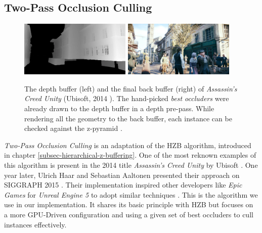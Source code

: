 \subsection{Two-Pass Occlusion Culling} \label{subsec-two-pass-occlusion-culling}

\begin{figure}[h]
    \centering
    \includegraphics[width=200px]{images/graphics/depth-buffer-ac-unity.png}
    \includegraphics[width=200px]{images/graphics/final-frame-ac-unity.png}
    \caption{The depth buffer (left) and the final back buffer (right) of \emph{Assassin's Creed Unity} (Ubisoft, 2014 \cite{Ubisoft2014}). 
    The hand-picked \emph{best occluders} were already drawn to the depth buffer in a depth pre-pass.
    While rendering all the geometry to the back buffer, each instance can be checked against the z-pyramid \cite{Kruskonja2022}.}
    \label{fig:depth-buffer-ac-unity}
\end{figure}

\noindent
\emph{Two-Pass Occlusion Culling} is an adaptation of the \ac{HZB} algorithm, introduced in chapter 
\ref{subsec-hierarchical-z-buffering}. One of the most reknown examples of this algorithm is present in the 2014 
title \emph{Assassin's Creed Unity} by Ubisoft \cite{Ubisoft2014}. One year later, Ulrich Haar and Sebastian Aaltonen 
presented their approach on SIGGRAPH 2015 \cite{Aaltonen2015}. Their implementation inspired other developers like 
\emph{Epic Games} for \emph{Unreal Engine 5} to adopt similar techniques \cite{Karis2021}. This is the algorithm we 
use in our implementation. It shares its basic principle with \ac{HZB} but focuses on a more \ac{GPU}-Driven 
configuration and using a given set of best occluders to cull instances effectively. \\

